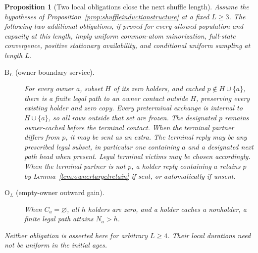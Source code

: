 \documentclass[11pt]{article}
\newtheorem{proposition}[theorem]{Proposition}
\begin{document}
\begin{proposition}[Two local obligations close the next shuffle length]
\label{prop:shuffleinductionclosure}
Assume the hypotheses of Proposition~\ref{prop:shuffleinductionstructure}
at a fixed $L\ge3$. The following two additional obligations,
if proved for every allowed population and capacity at this
length, imply uniform common-atom minorization, full-state
convergence, positive stationary availability, and conditional
uniform sampling at length $L$.
\begin{description}
\item[$\mathrm B_L$ (owner boundary service).]
For every owner $a$, subset $H$ of its zero holders, and cached
$p\notin H\cup\{a\}$, there is a finite legal path to an owner
contact outside $H$, preserving every existing holder and zero
copy. Every preterminal exchange is internal to $H\cup\{a\}$,
so all rows outside that set are frozen. The designated $p$
remains owner-cached before the terminal
contact. When the terminal partner differs from $p$, it may be
sent as an extra. The terminal reply may be any prescribed legal
subset, in particular one containing $a$ and a designated next
path head when present. Legal terminal victims may be chosen
accordingly. When the terminal partner is not $p$, a holder
reply containing $a$ retains $p$ by
Lemma~\ref{lem:ownertargetretain} if sent, or automatically if
unsent.
\item[$\mathrm O_L$ (empty-owner outward gain).]
When $C_a=\varnothing$, all $h$ holders are zero, and a holder
caches a nonholder, a finite legal path attains $N_a>h$.
\end{description}
Neither obligation is asserted here for arbitrary $L\ge4$.
Their local durations need not be uniform in the initial ages.
\end{proposition}
\end{document}
